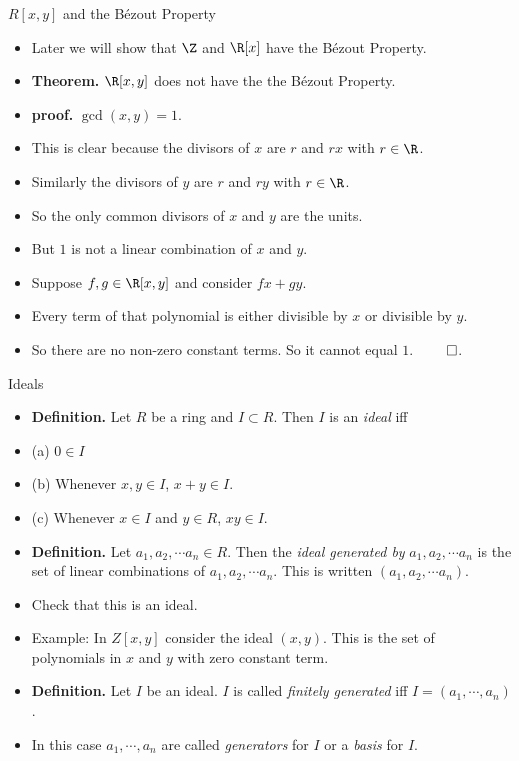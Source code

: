 \documentclass[handout]{beamer}
\begin{document}
\begin{frame}{$R[x,y]$ and the B\'{e}zout Property}

\begin{itemize}
  \item Later we will show that $\Z$ and $\R[x]$ have the B\'{e}zout Property.
  \item \textbf{Theorem.} $\R[x,y]$ does not have the the B\'{e}zout Property.
  \item \textbf{proof.} $\gcd(x,y) = 1$.
  \item This is clear because the divisors of $x$ are $r$ and $rx$ with $r\in\R$.
  \item Similarly the divisors of $y$ are $r$ and $ry$ with $r\in\R$.
  \item So the only common divisors of $x$ and $y$ are the units.
  \item But $1$ is not a linear combination of $x$ and $y$.
  \item Suppose $f,g\in\R[x,y]$ and consider $fx + gy$.
  \item Every term of that polynomial is either divisible by $x$ or divisible by $y$.
  \item So there are no non-zero constant terms. So it cannot equal $1$. $\qed$.
\end{itemize}

\end{frame}



\begin{frame}{Ideals}

\begin{itemize}
  \item \textbf{Definition.} Let $R$ be a ring and $I\subset R$. Then $I$ is an \emph{ideal} iff
  \item (a) $0\in I$
  \item (b) Whenever $x,y\in I$, $x+y\in I$.
  \item (c) Whenever $x\in I$ and $y\in R$, $xy\in I$.
  \item \textbf{Definition.} Let $a_1,a_2,\cdots a_n \in R$. Then the \emph{ideal generated by} $a_1,a_2,\cdots a_n$ is the set
  of linear combinations of $a_1,a_2,\cdots a_n$. This is written $(a_1,a_2, \cdots a_n)$.
  \item Check that this is an ideal.
  \item Example: In $Z[x,y]$ consider the ideal $(x,y)$. This is the set of polynomials in $x$ and $y$ with zero constant term.
  \item \textbf{Definition.} Let $I$ be an ideal. $I$ is called \emph{finitely generated} iff $I=(a_1,\cdots, a_n)$.
  \item In this
  case $a_1,\cdots, a_n$ are called \emph{generators} for $I$ or a \emph{basis} for $I$.
\end{itemize}

\end{frame}
\end{document}
